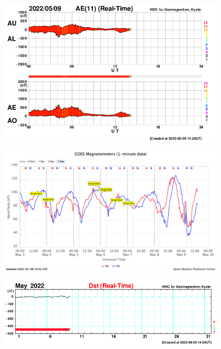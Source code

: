 \documentclass[a4paper, 10pt]{article}
\begin{document}
                     \begin{figure}[H]
    
                        \centering
   
                             \includegraphics[width=14cm]{./figures//figureGeomag_3.png}

                        \end{figure}

                     \begin{figure}[H]
    
                        \centering
   
                             \includegraphics[width=14cm]{./figures//figureGeomag_4.png}

                        \end{figure}

                     \begin{figure}[H]
    
                        \centering
   
                             \includegraphics[width=14cm]{./figures//figureGeomag_5.png}

                        \end{figure}
\end{document}
